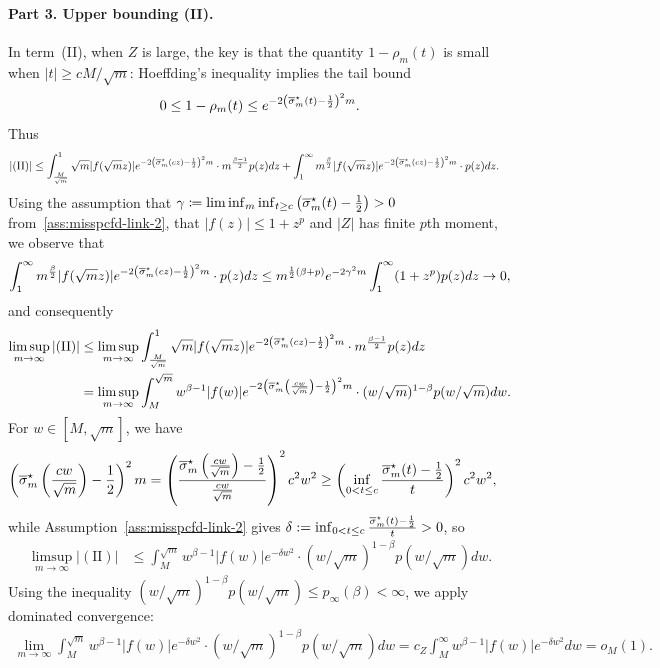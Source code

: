 \paragraph{Part 3. Upper bounding (II).}
In term~(II), when $Z$ is large, the key is that the quantity
$1-\rho_m(t)$ is
small when $|t| \geq cM /\sqrt{m}$: Hoeffding's
inequality implies the tail bound
\begin{align*}
  0 \leq 1 - \rho_m(t) \leq e^{-2 \left(\overline{\sigma}_m^\star(t) - \frac{1}{2}\right)^2 m}  .
\end{align*}
Thus
\begin{align}
	|\mathrm{(II)}| &\leq  \int_{\frac{M}{\sqrt m}}^1 \sqrt m |f(\sqrt m z)|  e^{-2\left(\overline{\sigma}_m^\star(cz) - \frac{1}{2}\right)^2m}\cdot  m^{\frac{\beta-1}{2}} p(z) dz + \int_{1}^\infty m^{\frac \beta 2} |f(\sqrt m z)|  e^{-2\left(\overline{\sigma}_m^\star(cz) - \frac{1}{2}\right)^2m}\cdot  p(z) dz   . \nonumber  
\end{align}
Using the assumption that $\gamma \coloneqq\liminf_m \inf_{t \geq c}
\left({\overline{\sigma}_m^\star(t) - \frac{1}{2}}\right) > 0$ from~\eqref{ass:misspcfd-link-2},
that $|f(z)| \leq 1 +z^p$ and $|Z|$ has finite $p$th moment, we observe
that
\begin{align*}
	\int_{1}^\infty m^{\frac \beta 2} |f(\sqrt m z)|  e^{-2\left(\overline{\sigma}_m^\star(cz) - \frac{1}{2}\right)^2m}\cdot  p(z) dz\leq  m^{\frac{1}{2}(\beta + p)}  e^{-2\gamma^2m} \int_1^\infty (1 + z^p) p(z) dz \to 0  ,
\end{align*}
and consequently
\begin{align*} 
	\limsup_{m \to \infty} |\mathrm{(II)}|  & \leq  \limsup_{m \to \infty} \int_{\frac{M}{\sqrt m}}^1 \sqrt m |f(\sqrt m z)|  e^{-2\left(\overline{\sigma}_m^\star(cz) - \frac{1}{2}\right)^2m}\cdot  m^{\frac{\beta-1}{2}} p(z) dz \nonumber \\
	& = \limsup_{m \to \infty}   \int_{M}^{\sqrt{m}}  w^{\beta - 1} |f(w)| e^{-2\left(\overline{\sigma}_m^\star\left({\frac{cw}{\sqrt m}}\right) - \frac{1}{2}\right)^2m} \cdot (w/\sqrt{m})^{1-\beta} p(w/\sqrt{m}) d w   .
\end{align*}
For $w \in [M, \sqrt m]$, we have
\begin{align*}
	\left(\overline{\sigma}_m^\star\left({\frac{cw}{\sqrt m}}\right) - \frac{1}{2}\right)^2m & = \left(\frac{\overline{\sigma}_m^\star\left({\frac{cw}{\sqrt m}}\right) - \frac{1}{2}}{\frac{cw}{\sqrt m}}\right)^2 c^2 w^2 \geq \left(\inf_{0 < t \leq c} \frac{\overline{\sigma}_m^\star(t) - \frac{1}{2}}{t}\right)^2 c^2 w^2   ,
\end{align*}
while Assumption~\eqref{ass:misspcfd-link-2} gives $\delta:=\inf_{0 < t \leq c} \frac{\overline{\sigma}_m^\star(t) - \frac{1}{2}}{t} > 0$,  so
\begin{align*}
\limsup_{m \to \infty} |\mathrm{(II)}| & \leq \int_{M}^{\sqrt{m}}  w^{\beta - 1} |f(w)| e^{-\delta w^2} \cdot (w/\sqrt{m})^{1-\beta} p(w/\sqrt{m}) d w. %
\end{align*}
Using the inequality
$(w/\sqrt{m})^{1-\beta} p(w/\sqrt{m}) \leq p_\infty(\beta) < \infty$, we
apply dominated convergence:
\begin{align*}
  \lim_{m \to \infty} \int_{M}^{\sqrt{m}}  w^{\beta - 1} |f(w)| e^{-\delta w^2} \cdot (w/\sqrt{m})^{1-\beta} p(w/\sqrt{m}) d w  = c_Z \int_M^\infty  w^{\beta - 1}  |f(w)| e^{-\delta w^2} dw = o_M(1).
\end{align*}

